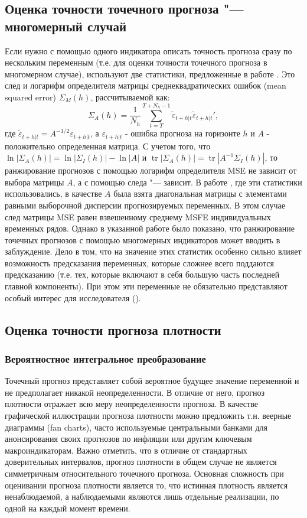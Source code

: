 \documentclass[11pt]{article} %
\DeclareMathOperator{\tr}{tr}
\begin{document}
\subsection{Оценка точности точечного прогноза "--- многомерный случай}
Если нужно с помощью одного индикатора описать точность прогноза сразу по нескольким переменным (т.е. для оценки точности точечного прогноза в многомерном случае), используют две статистики, предложенные в работе \cite{adolfson_al_2007}. Это след и логарифм определителя матрицы  среднеквадратических ошибок (mean squared error) $\Sigma_M(h)$, рассчитываемой как:
\begin{equation}
\Sigma_A(h)=\frac{1}{N_h}\sum_{t=T}^{T+N_h-1} \tilde \varepsilon_{t+h|t}\tilde \varepsilon_{t+h|t}',
\end{equation}
где  $\tilde \varepsilon_{t+h|t}= A^{-1/2} \varepsilon_{t+h|t}$, а $\varepsilon_{t+h|t}$ - ошибка прогноза на горизонте $h$ и $A$ - положительно определенная матрица.
С учетом того, что $\ln |\Sigma_A(h)| = \ln|\Sigma_I(h)|-\ln|A|$ и  $\tr|\Sigma_A(h)| = \tr|A^{-1}\Sigma_I(h)|$, то ранжирование прогнозов с помощью логарифм определителя MSE не зависит от выбора матрицы $A$, а с помощью следа "--- зависит. В работе \cite{adolfson_al_2007}, где эти статистики использовались, в качестве $A$ была взята диагональная матрицы с элементами равными выборочной дисперсии прогнозируемых переменных. В этом случае след матрицы MSE равен взвешенному среднему MSFE индивидуальных временных рядов. Однако в указанной работе было  показано, что ранжирование точечных прогнозов с помощью многомерных индикаторов может вводить в заблуждение. Дело в том, что на значение этих статистик особенно сильно влияет возможность предсказания переменных, которые сложнее всего поддаются предсказанию (т.е. тех, которые включают в себя большую часть последней главной компоненты). При этом эти переменные не обязательно представляют особый интерес для исследователя (\cite{adolfson_al_2007}).





\subsection{Оценка точности прогноза плотности}
\subsubsection{Вероятностное интегральное преобразование}
Точечный прогноз представляет собой  вероятное будущее значение переменной и не предполагает никакой неопределенности. В отличие от него, прогноз плотности отражает всю меру неопределенности прогноза. В качестве графической иллюстрации прогноза плотности можно предложить т.н. веерные  диаграммы (fan charts), часто используемые центральными банками для анонсирования своих прогнозов по инфляции или другим ключевым макроиндикаторам. Важно отметить, что в отличие от стандартных доверительных интервалов, прогноз плотности в общем случае не является симметричным относительного точечного прогноза.
Основная сложность при оценивании прогноза плотности является то, что истинная плотность является ненаблюдаемой, а наблюдаемыми являются лишь отдельные реализации, по одной на каждый момент времени.
\end{document}
